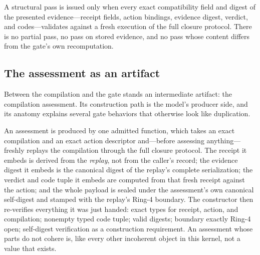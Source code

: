\begin{invariant}\label{ch09:inv:total}
A structural pass is issued only when every exact compatibility field and digest of the presented evidence---receipt fields, action bindings, evidence digest, verdict, and codes---validates against a fresh execution of the full closure protocol. There is no partial pass, no pass on stored evidence, and no pass whose content differs from the gate's own recomputation.
\end{invariant}

\subsection{The assessment as an artifact}\label{ch09:assessment-artifact}

Between the compilation and the gate stands an intermediate artifact: the compilation assessment. Its construction path is the model's producer side, and its anatomy explains several gate behaviors that otherwise look like duplication.

An assessment is produced by one admitted function, which takes an exact compilation and an exact action descriptor and---before assessing anything---freshly replays the compilation through the full closure protocol. The receipt it embeds is derived from the \emph{replay}, not from the caller's record; the evidence digest it embeds is the canonical digest of the replay's complete serialization; the verdict and code tuple it embeds are computed from that fresh receipt against the action; and the whole payload is sealed under the assessment's own canonical self-digest and stamped with the replay's Ring-4 boundary. The constructor then re-verifies everything it was just handed: exact types for receipt, action, and compilation; nonempty typed code tuple; valid digests; boundary exactly Ring-4 open; self-digest verification as a construction requirement. An assessment whose parts do not cohere is, like every other incoherent object in this kernel, not a value that exists.

